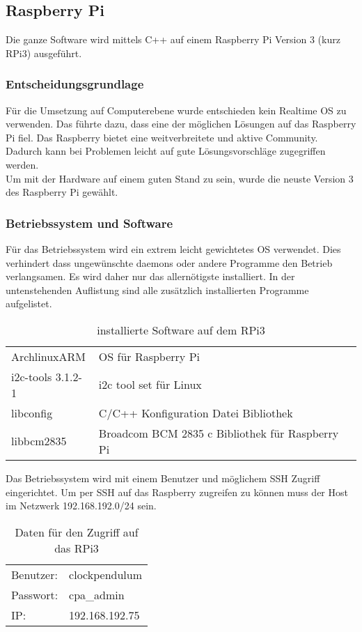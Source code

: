 \subsection{Raspberry Pi}
Die ganze Software wird mittels C++ auf einem Raspberry Pi Version 3 (kurz RPi3) ausgeführt.

\subsubsection{Entscheidungsgrundlage}
Für die Umsetzung auf Computerebene wurde entschieden kein Realtime OS zu verwenden. Das führte dazu, dass eine der möglichen Lösungen auf das Raspberry Pi fiel. Das Raspberry bietet eine weitverbreitete und aktive Community. Dadurch kann bei Problemen leicht auf gute Lösungsvorschläge zugegriffen werden.\\
Um mit der Hardware auf einem guten Stand zu sein, wurde die neuste Version 3 des Raspberry Pi gewählt.

\subsubsection{Betriebssystem und Software}
Für das Betriebssystem wird ein extrem leicht gewichtetes OS verwendet. Dies verhindert dass ungewünschte daemons oder andere Programme den Betrieb verlangsamen. Es wird daher nur das allernötigste installiert. In der untenstehenden Auflistung sind alle zusätzlich installierten Programme aufgelistet. 

\begin{table}[h]
    \begin{tabular}{ll}
        ArchlinuxARM & OS für Raspberry Pi\\
        i2c-tools 3.1.2-1 & i2c tool set für Linux\\
        libconfig & C/C++ Konfiguration Datei Bibliothek\\
        libbcm2835 & Broadcom BCM 2835 c Bibliothek für Raspberry Pi\\
    \end{tabular}
    \caption{installierte Software auf dem RPi3}
\end{table}

\noindent Das Betriebssystem wird mit einem Benutzer und möglichem SSH Zugriff eingerichtet. Um per SSH auf das Raspberry zugreifen zu können muss der Host im Netzwerk 192.168.192.0/24 sein.
\begin{table}[h]
    \begin{tabular}{ll}
        Benutzer: & clockpendulum \\
        Passwort: & cpa\_admin \\
        IP: & 192.168.192.75 \\
    \end{tabular}
    \caption{Daten für den Zugriff auf das RPi3}
\end{table}
